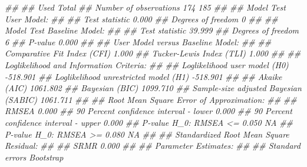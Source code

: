 \documentclass[
  chinese-hans,
  letterpaper,
  DIV=11,
  numbers=noendperiod]{scrartcl}
\newenvironment{Shaded}{\begin{snugshade}}{\end{snugshade}}
\newcommand{\DocumentationTok}[1]{\textcolor[rgb]{0.37,0.37,0.37}{\textit{#1}}}
\begin{document}
\begin{Shaded}
\begin{Highlighting}[numbers=left,,]
\DocumentationTok{\#\# }
\DocumentationTok{\#\#                                                   Used       Total}
\DocumentationTok{\#\#   Number of observations                           174         185}
\DocumentationTok{\#\# }
\DocumentationTok{\#\# Model Test User Model:}
\DocumentationTok{\#\#                                                       }
\DocumentationTok{\#\#   Test statistic                                 0.000}
\DocumentationTok{\#\#   Degrees of freedom                                 0}
\DocumentationTok{\#\# }
\DocumentationTok{\#\# Model Test Baseline Model:}
\DocumentationTok{\#\# }
\DocumentationTok{\#\#   Test statistic                                39.999}
\DocumentationTok{\#\#   Degrees of freedom                                 6}
\DocumentationTok{\#\#   P{-}value                                        0.000}
\DocumentationTok{\#\# }
\DocumentationTok{\#\# User Model versus Baseline Model:}
\DocumentationTok{\#\# }
\DocumentationTok{\#\#   Comparative Fit Index (CFI)                    1.000}
\DocumentationTok{\#\#   Tucker{-}Lewis Index (TLI)                       1.000}
\DocumentationTok{\#\# }
\DocumentationTok{\#\# Loglikelihood and Information Criteria:}
\DocumentationTok{\#\# }
\DocumentationTok{\#\#   Loglikelihood user model (H0)               {-}518.901}
\DocumentationTok{\#\#   Loglikelihood unrestricted model (H1)       {-}518.901}
\DocumentationTok{\#\#                                                       }
\DocumentationTok{\#\#   Akaike (AIC)                                1061.802}
\DocumentationTok{\#\#   Bayesian (BIC)                              1099.710}
\DocumentationTok{\#\#   Sample{-}size adjusted Bayesian (SABIC)       1061.711}
\DocumentationTok{\#\# }
\DocumentationTok{\#\# Root Mean Square Error of Approximation:}
\DocumentationTok{\#\# }
\DocumentationTok{\#\#   RMSEA                                          0.000}
\DocumentationTok{\#\#   90 Percent confidence interval {-} lower         0.000}
\DocumentationTok{\#\#   90 Percent confidence interval {-} upper         0.000}
\DocumentationTok{\#\#   P{-}value H\_0: RMSEA \textless{}= 0.050                       NA}
\DocumentationTok{\#\#   P{-}value H\_0: RMSEA \textgreater{}= 0.080                       NA}
\DocumentationTok{\#\# }
\DocumentationTok{\#\# Standardized Root Mean Square Residual:}
\DocumentationTok{\#\# }
\DocumentationTok{\#\#   SRMR                                           0.000}
\DocumentationTok{\#\# }
\DocumentationTok{\#\# Parameter Estimates:}
\DocumentationTok{\#\# }
\DocumentationTok{\#\#   Standard errors                            Bootstrap}

\end{Highlighting}
\end{Shaded}
\end{document}
